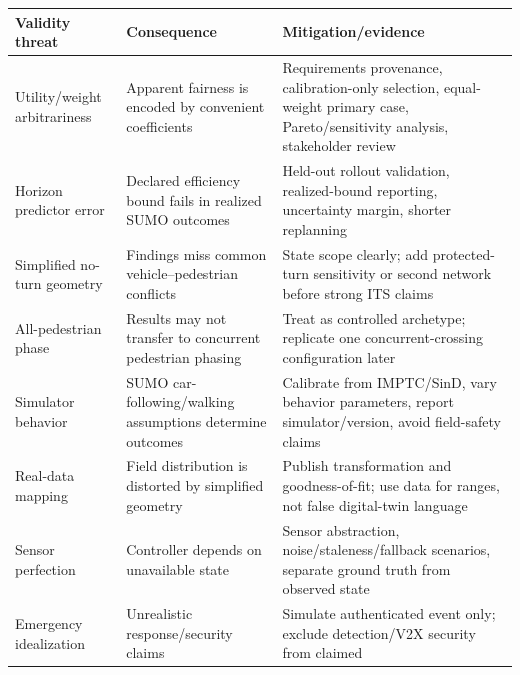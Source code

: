 \documentclass[
  english,
  11pt,
  a4paper,
]{article}
\newcounter{none} %
\begin{document}
{\def\LTcaptype{none} %
\begin{longtable}[]{@{}
  >{\raggedright\arraybackslash}p{}
  >{\raggedright\arraybackslash}p{}
  >{\raggedright\arraybackslash}p{}@{}}
\toprule\noalign{}
\begin{minipage}[b]{\linewidth}\raggedright
Validity threat
\end{minipage} & \begin{minipage}[b]{\linewidth}\raggedright
Consequence
\end{minipage} & \begin{minipage}[b]{\linewidth}\raggedright
Mitigation/evidence
\end{minipage} \\
\midrule\noalign{}
\endhead
\bottomrule\noalign{}
\endlastfoot
Utility/weight arbitrariness & Apparent fairness is encoded by
convenient coefficients & Requirements provenance, calibration-only
selection, equal-weight primary case, Pareto/sensitivity analysis,
stakeholder review \\
Horizon predictor error & Declared efficiency bound fails in realized
SUMO outcomes & Held-out rollout validation, realized-bound reporting,
uncertainty margin, shorter replanning \\
Simplified no-turn geometry & Findings miss common vehicle--pedestrian
conflicts & State scope clearly; add protected-turn sensitivity or
second network before strong ITS claims \\
All-pedestrian phase & Results may not transfer to concurrent pedestrian
phasing & Treat as controlled archetype; replicate one
concurrent-crossing configuration later \\
Simulator behavior & SUMO car-following/walking assumptions determine
outcomes & Calibrate from IMPTC/SinD, vary behavior parameters, report
simulator/version, avoid field-safety claims \\
Real-data mapping & Field distribution is distorted by simplified
geometry & Publish transformation and goodness-of-fit; use data for
ranges, not false digital-twin language \\
Sensor perfection & Controller depends on unavailable state & Sensor
abstraction, noise/staleness/fallback scenarios, separate ground truth
from observed state \\
Emergency idealization & Unrealistic response/security claims & Simulate
authenticated event only; exclude detection/V2X security from claimed

\end{longtable}}
\end{document}
